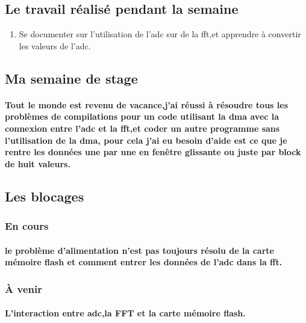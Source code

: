 \documentclass[a4paper]{article}
\begin{document}
 \subsection{Le travail réalisé pendant la semaine}
 \begin{enumerate}
\item {Se documenter sur l'utilisation de l'adc sur de la fft,et apprendre à convertir les valeurs de l'adc.}
\end{enumerate}

\subsection{Ma semaine de stage}
    \paragraph{Tout le monde est revenu de vacance,j'ai réussi à résoudre tous les problèmes de compilations pour un code utilisant la dma avec la connexion entre l'adc et la fft,et coder un autre programme sans l'utilisation de la dma, pour cela j'ai eu besoin d'aide est ce que je rentre les données une par une en fenêtre glissante ou juste par block de huit valeurs.}
    
    \subsection{Les blocages}
\subsubsection{En cours}
    \paragraph{le problème d'alimentation n'est pas toujours résolu de la carte mémoire flash et comment entrer les données de l'adc dans la fft.}
\subsubsection{À venir}
    \paragraph{L'interaction entre adc,la FFT et la carte mémoire flash.}
	\paragraph{}
\end{document}
